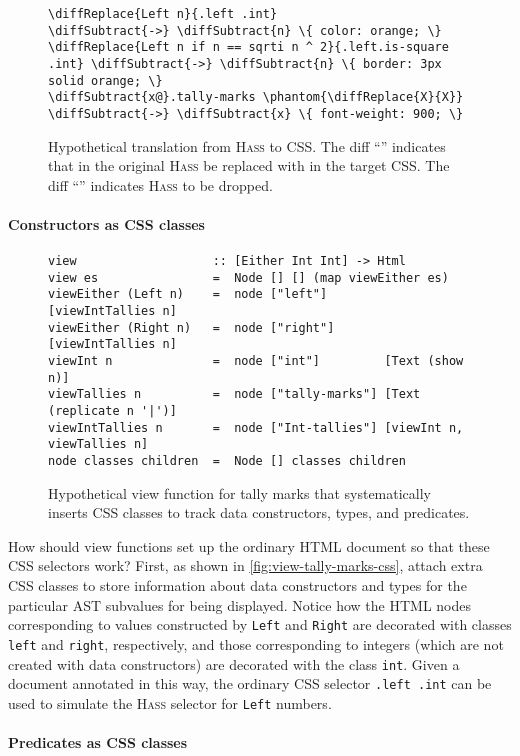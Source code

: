 \documentclass[acmsmall, screen]{acmart}
\newcommand{\parahead}[1]
  {\paragraph{\textbf{#1}}}
\newcommand{\hass}
{\textsc{Hass}}
\newcommand{\cssClass}[1]
  {\texttt{#1}}
\begin{document}
\begin{figure}[h]
\small

\begin{Verbatim}[commandchars=\\\{\}]
\diffReplace{Left n}{.left .int}                               \diffSubtract{->} \diffSubtract{n} \{ color: orange; \}
\diffReplace{Left n if n == sqrti n ^ 2}{.left.is-square .int} \diffSubtract{->} \diffSubtract{n} \{ border: 3px solid orange; \}
\diffSubtract{x@}.tally-marks \phantom{\diffReplace{X}{X}}                              \diffSubtract{->} \diffSubtract{x} \{ font-weight: 900; \}
\end{Verbatim}



\caption{
Hypothetical translation from \hass{} to CSS.
The diff ``'' indicates that  in the original \hass{} be replaced with  in the target CSS.
The diff ``'' indicates \hass{}  to be dropped.
}
\label{fig:tally-marks-css}
\end{figure}
 


\parahead{Constructors as CSS classes}

\begin{figure}[b]
\small
\begin{Verbatim}[commandchars=\\\{\}]
view                   :: [Either Int Int] -> Html
view es                =  Node [] [] (map viewEither es)
viewEither (Left n)    =  node ["left"]        [viewIntTallies n]
viewEither (Right n)   =  node ["right"]       [viewIntTallies n]
viewInt n              =  node ["int"]         [Text (show n)]
viewTallies n          =  node ["tally-marks"] [Text (replicate n '|')]
viewIntTallies n       =  node ["Int-tallies"] [viewInt n, viewTallies n]
node classes children  =  Node [] classes children
\end{Verbatim}

\caption{
Hypothetical view function for tally marks that systematically inserts CSS classes to track data constructors, types, and predicates.
}
\label{fig:view-tally-marks-css}
\end{figure}
 
How should view functions set up the ordinary HTML document so that these CSS selectors work?
First, as shown in \autoref{fig:view-tally-marks-css},
attach extra CSS classes to store information about data constructors and types for the particular AST subvalues for being displayed.
Notice how the HTML nodes corresponding to values constructed by \texttt{Left} and \texttt{Right} are decorated with classes \cssClass{left} and \cssClass{right}, respectively,
and those corresponding to integers (which are not created with data constructors) are decorated with the class \cssClass{int}.
Given a document annotated in this way,
the ordinary CSS selector \cssClass{.left .int} can be used to simulate the \hass{} selector for \texttt{Left} numbers.
\parahead{Predicates as CSS classes}
\end{document}
